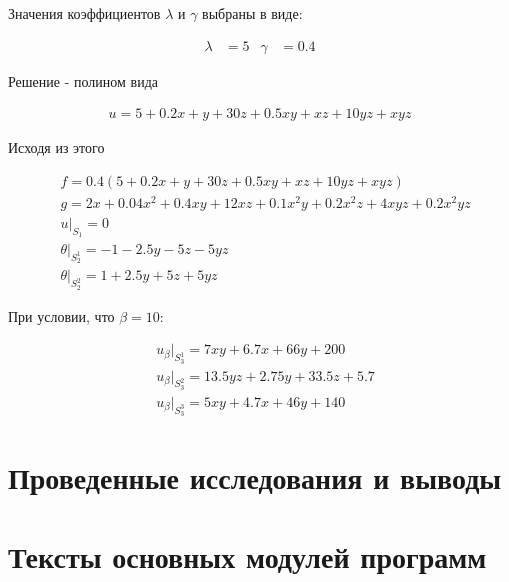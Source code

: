 \documentclass[12pt, a4paper]{article}
\begin{document}
\noindent Значения коэффициентов $\lambda$ и $\gamma$ выбраны в виде:

\begin{align}
  \lambda &= 5 & \gamma &= 0.4
\end{align}

\noindent Решение - полином вида

\begin{align}
  u = 5 + 0.2x + y + 30z + 0.5xy + xz + 10yz + xyz
\end{align}

\noindent Исходя из этого

\begin{align}
  &f = 0.4(5 + 0.2x + y + 30z + 0.5xy + xz + 10yz + xyz) \\[1ex]
  &g = 2x + 0.04x^2 + 0.4xy + 12xz + 0.1x^2y + 0.2x^2z + 4xyz + 0.2x^2yz \\[1ex]
  &u|_{S_1} = 0 \\[1ex]
  &\theta|_{S_2^1} = -1 - 2.5y - 5z - 5yz \\[1ex]
  &\theta|_{S_2^2} = 1 + 2.5y + 5z + 5yz
\end{align}

\noindent При условии, что $\beta = 10$:

\begin{align}
  &u_{\beta}|_{S_3^1} = 7xy + 6.7x + 66y + 200 \\[1ex]
  &u_{\beta}|_{S_3^2} = 13.5yz + 2.75y + 33.5z + 5.7 \\[1ex]
  &u_{\beta}|_{S_3^3} = 5xy + 4.7x + 46y + 140
\end{align}


\section{Проведенные исследования и выводы}
\section{Тексты основных модулей программ}
\end{document}
